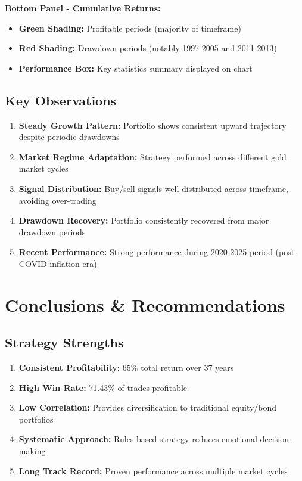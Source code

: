 \documentclass[11pt,a4paper]{article}
\begin{document}
\textbf{Bottom Panel - Cumulative Returns:}
\begin{itemize}
    \item \textbf{Green Shading:} Profitable periods (majority of timeframe)
    \item \textbf{Red Shading:} Drawdown periods (notably 1997-2005 and 2011-2013)
    \item \textbf{Performance Box:} Key statistics summary displayed on chart
\end{itemize}

\subsection{Key Observations}

\begin{enumerate}
    \item \textbf{Steady Growth Pattern:} Portfolio shows consistent upward trajectory despite periodic drawdowns
    \item \textbf{Market Regime Adaptation:} Strategy performed across different gold market cycles
    \item \textbf{Signal Distribution:} Buy/sell signals well-distributed across timeframe, avoiding over-trading
    \item \textbf{Drawdown Recovery:} Portfolio consistently recovered from major drawdown periods
    \item \textbf{Recent Performance:} Strong performance during 2020-2025 period (post-COVID inflation era)
\end{enumerate}

\newpage

\section{Conclusions \& Recommendations}

\subsection{Strategy Strengths}

\begin{enumerate}
    \item \textbf{Consistent Profitability:} 65\% total return over 37 years
    \item \textbf{High Win Rate:} 71.43\% of trades profitable
    \item \textbf{Low Correlation:} Provides diversification to traditional equity/bond portfolios
    \item \textbf{Systematic Approach:} Rules-based strategy reduces emotional decision-making
    \item \textbf{Long Track Record:} Proven performance across multiple market cycles
\end{enumerate}
\end{document}
